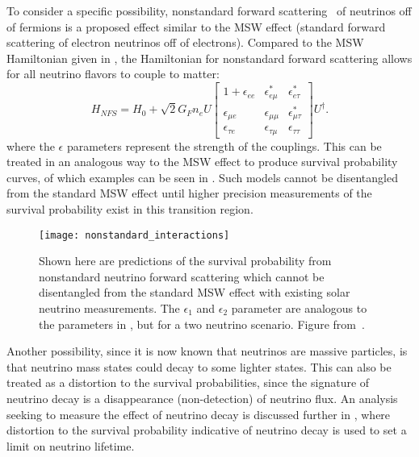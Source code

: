 To consider a specific possibility, nonstandard forward scattering~\cite{nonstandard_forward_scatter} of neutrinos off of fermions is a proposed effect similar to the MSW effect (standard forward scattering of electron neutrinos off of electrons).
Compared to the MSW Hamiltonian given in , the Hamiltonian for nonstandard forward scattering allows for all neutrino flavors to couple to matter:
\begin{equation}
H_{NFS} = H_{0} + \sqrt{2} G_F n_e U\begin{bmatrix}
1+\epsilon_{ee} & \epsilon_{e\mu}^* & \epsilon_{e\tau}^* \\
\epsilon_{\mu e} & \epsilon_{\mu\mu} & \epsilon_{\mu\tau}^* \\
\epsilon_{\tau e} & \epsilon_{\tau\mu} & \epsilon_{\tau\tau}
\end{bmatrix}U^\dagger.
\label{eq:nsi}
\end{equation}
where the $\epsilon$ parameters represent the strength of the couplings.
This can be treated in an analogous way to the MSW effect to produce survival probability curves, of which examples can be seen in .
Such models cannot be disentangled from the standard MSW effect until higher precision measurements of the survival probability exist in this transition region.

\begin{figure}
\centering
\texttt{[image: nonstandard\_interactions]}
\caption{\label{fig:nonstandard}Shown here are predictions of the survival probability from nonstandard neutrino forward scattering which cannot be disentangled from the standard MSW effect with existing solar neutrino measurements. The $\epsilon_1$ and $\epsilon_2$ parameter are analogous to the parameters in , but for a two neutrino scenario. Figure from~\cite{nonstandard_interactions}.}
\end{figure}

Another possibility, since it is now known that neutrinos are massive particles, is that neutrino mass states could decay to some lighter states.
This can also be treated as a distortion to the survival probabilities, since the signature of neutrino decay is a disappearance (non-detection) of neutrino flux.
An analysis seeking to measure the effect of neutrino decay is discussed further in , where distortion to the survival probability indicative of neutrino decay is used to set a limit on neutrino lifetime.


